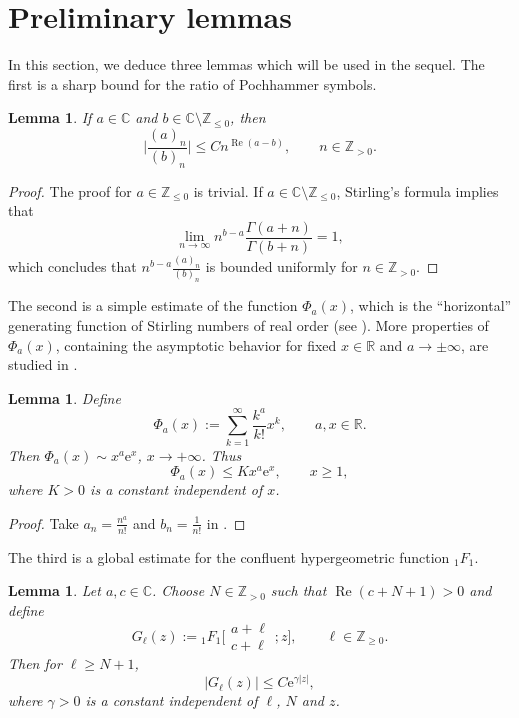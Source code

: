 \documentclass[10pt,a4paper]{amsart}
\numberwithin{equation}{section}
\newtheorem{Lemma}[Theorem]{Lemma}
\newcommand{\CC}{\ensuremath{\mathbb{C}}}
\newcommand{\RR}{\ensuremath{\mathbb{R}}}
\newcommand{\ZZ}{\ensuremath{\mathbb{Z}}}
\newcommand{\me}{\mathrm{e}}
\begin{document}
\section{Preliminary lemmas}\label{Sect. 2}

In this section, we deduce three lemmas which will be used in the sequel. The first is a sharp bound for the ratio of Pochhammer symbols.
\begin{Lemma}\label{Lemma: ratio of Pochhammer symbol}
	If $a\in\CC$ and $b\in\CC\setminus\ZZ_{\leqslant 0}$, then
	\[\biggl|\frac{(a)_n}{(b)_n}\biggr|\leqslant Cn^{\operatorname{Re}(a-b)},\qquad n\in\ZZ_{>0}.\]
\end{Lemma}
\begin{proof}
	The proof for $a\in\ZZ_{\leqslant 0}$ is trivial. If $a\in\CC\setminus\ZZ_{\leqslant 0}$, Stirling's formula implies that
		\[\lim_{n\to\infty}n^{b-a}\frac{\Gamma(a+n)}{\Gamma(b+n)}=1,\]
		which concludes that $n^{b-a}\frac{(a)_n}{(b)_n}$ is bounded uniformly for $n\in\ZZ_{>0}$.
\end{proof}

The second is a simple estimate of the function $\Phi_a(x)$, which is the ``horizontal'' generating function of Stirling numbers of real order (see \cite[Section~8]{Butzer_Kilbas_Trujillo-2003}). More properties of $\Phi_a(x)$, containing the asymptotic behavior for fixed $x\in\RR$ and $a\to\pm\infty$, are studied in \cite[Section~3.2]{VanGorder-2009}.
\begin{Lemma}\label{Phi_a(x) estimate}
	Define
	\[\Phi_a(x):=\sum_{k=1}^{\infty}\frac{k^a}{k!}x^k,\qquad a,x\in\RR.\]
	Then $\Phi_a(x)\sim x^a\me^x$, $x\to +\infty$. Thus
	\[\Phi_a(x)\leqslant Kx^a\me^x,\qquad x\geqslant 1,\]
	where $K>0$ is a constant independent of $x$.
\end{Lemma}
\begin{proof}
	Take $a_n=\frac{n^a}{n!}$ and $b_n=\frac{1}{n!}$ in \cite[p.~12, Problem~72]{Polya_Szego-vol.2}.
\end{proof}

The third is a global estimate for the confluent hypergeometric function $_1F_1$.

\begin{Lemma}\label{lem-1F1}
	Let $a,c\in\CC$. Choose $N\in\ZZ_{>0}$ such that $\operatorname{Re}(c+N+1)>0$ and define
	\begin{equation}\label{G_l definition}
			G_{\ell}(z):={}_1F_1\bigg[\begin{matrix}
				a+\ell\\
				c+\ell
			\end{matrix};z\bigg],\qquad \ell\in\ZZ_{\geqslant 0}.
	\end{equation}
	Then for $\ell\geqslant N+1$,
 \begin{equation}\label{G_l inequality}
			|G_\ell(z)|\leqslant C\me^{\gamma|z|},
	\end{equation}
	where $\gamma>0$ is a constant independent of $\ell$, $N$ and $z$.
\end{Lemma}
\end{document}

